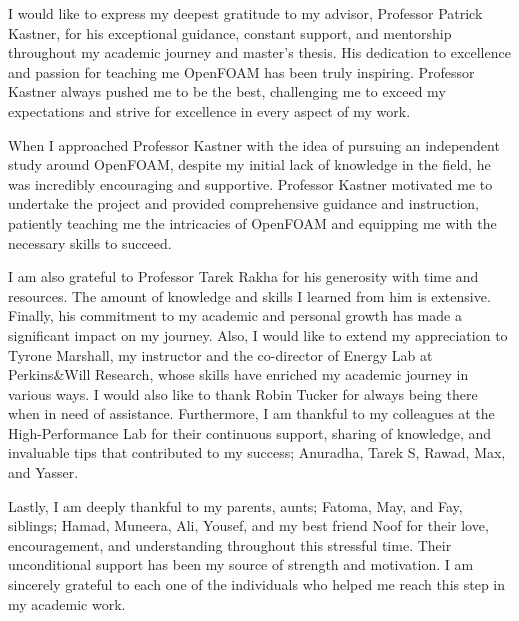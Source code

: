 
\begin{acknowledgments}

I would like to express my deepest gratitude to my advisor, Professor Patrick Kastner, for his exceptional guidance, constant support, and mentorship throughout my academic journey and master's thesis. His dedication to excellence and passion for teaching me OpenFOAM has been truly inspiring. Professor Kastner always pushed me to be the best, challenging me to exceed my expectations and strive for excellence in every aspect of my work. 

When I approached Professor Kastner with the idea of pursuing an independent study around OpenFOAM, despite my initial lack of knowledge in the field, he was incredibly encouraging and supportive. Professor Kastner motivated me to undertake the project and provided comprehensive guidance and instruction, patiently teaching me the intricacies of OpenFOAM and equipping me with the necessary skills to succeed.

I am also grateful to Professor Tarek Rakha for his generosity with time and resources. The amount of knowledge and skills I learned from him is extensive. Finally, his commitment to my academic and personal growth has made a significant impact on my journey. Also, I would like to extend my appreciation to Tyrone Marshall, my instructor and the co-director of Energy Lab at Perkins\&Will Research, whose skills have enriched my academic journey in various ways. I would also like to thank Robin Tucker for always being there when in need of assistance. Furthermore, I am thankful to my colleagues at the High-Performance Lab for their continuous support, sharing of knowledge, and invaluable tips that contributed to my success; Anuradha, Tarek S, Rawad, Max, and Yasser.

Lastly, I am deeply thankful to my parents, aunts; Fatoma, May, and Fay, siblings; Hamad, Muneera, Ali, Yousef, and my best friend Noof for their love, encouragement, and understanding throughout this stressful time. Their unconditional support has been my source of strength and motivation.
I am sincerely grateful to each one of the individuals who helped me reach this step in my academic work.



\end{acknowledgments}
